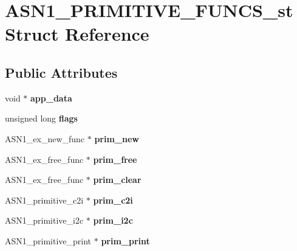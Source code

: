 \hypertarget{struct_a_s_n1___p_r_i_m_i_t_i_v_e___f_u_n_c_s__st}{}\section{A\+S\+N1\+\_\+\+P\+R\+I\+M\+I\+T\+I\+V\+E\+\_\+\+F\+U\+N\+C\+S\+\_\+st Struct Reference}
\label{struct_a_s_n1___p_r_i_m_i_t_i_v_e___f_u_n_c_s__st}
\subsection*{Public Attributes}
\begin{DoxyCompactItemize}
\item 
\mbox{\label{struct_a_s_n1___p_r_i_m_i_t_i_v_e___f_u_n_c_s__st_a4ab6489e068922032976724d4bb02644}} 
void $\ast$ {\bfseries app\+\_\+data}
\item 
\mbox{\label{struct_a_s_n1___p_r_i_m_i_t_i_v_e___f_u_n_c_s__st_a9ea38cfb70abc1afd0fe8f272015737b}} 
unsigned long {\bfseries flags}
\item 
\mbox{\label{struct_a_s_n1___p_r_i_m_i_t_i_v_e___f_u_n_c_s__st_a0fe6cb24ad4850f35c72bdc080ad9c4a}} 
A\+S\+N1\+\_\+ex\+\_\+new\+\_\+func $\ast$ {\bfseries prim\+\_\+new}
\item 
\mbox{\label{struct_a_s_n1___p_r_i_m_i_t_i_v_e___f_u_n_c_s__st_a19634516049ebbaa076d9c1693580130}} 
A\+S\+N1\+\_\+ex\+\_\+free\+\_\+func $\ast$ {\bfseries prim\+\_\+free}
\item 
\mbox{\label{struct_a_s_n1___p_r_i_m_i_t_i_v_e___f_u_n_c_s__st_af2d9eebde7d5b07a096954e4e8129e09}} 
A\+S\+N1\+\_\+ex\+\_\+free\+\_\+func $\ast$ {\bfseries prim\+\_\+clear}
\item 
\mbox{\label{struct_a_s_n1___p_r_i_m_i_t_i_v_e___f_u_n_c_s__st_ad798e3c6d829661a8c5607d271454a4f}} 
A\+S\+N1\+\_\+primitive\+\_\+c2i $\ast$ {\bfseries prim\+\_\+c2i}
\item 
\mbox{\label{struct_a_s_n1___p_r_i_m_i_t_i_v_e___f_u_n_c_s__st_abee28722d73a140d6fdff1ee669843da}} 
A\+S\+N1\+\_\+primitive\+\_\+i2c $\ast$ {\bfseries prim\+\_\+i2c}
\item 
\mbox{\label{struct_a_s_n1___p_r_i_m_i_t_i_v_e___f_u_n_c_s__st_a8fd7a2f06014a2bb7c4bd274407eb61d}} 
A\+S\+N1\+\_\+primitive\+\_\+print $\ast$ {\bfseries prim\+\_\+print}
\end{DoxyCompactItemize}


